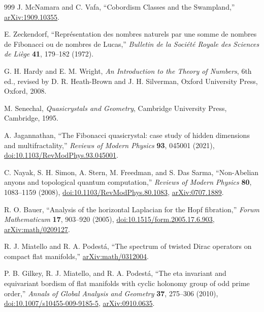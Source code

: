 \documentclass[aps,prd,reprint,nofootinbib,superscriptaddress,floatfix]{revtex4-2}
\numberwithin{equation}{section}
\theoremstyle{definition}
\theoremstyle{plain}
\begin{document}
\begin{thebibliography}{999}
J. McNamara and C. Vafa,
``Cobordism Classes and the Swampland,''
\href{https://arxiv.org/abs/1909.10355}{arXiv:1909.10355}.



E. Zeckendorf,
``Repr\'esentation des nombres naturels par une somme de nombres de Fibonacci ou de nombres de Lucas,''
\emph{Bulletin de la Soci\'et\'e Royale des Sciences de Li\`ege}
\textbf{41}, 179--182 (1972).

G. H. Hardy and E. M. Wright,
\emph{An Introduction to the Theory of Numbers},
6th ed., revised by D. R. Heath-Brown and J. H. Silverman,
Oxford University Press, Oxford, 2008.

M. Senechal,
\emph{Quasicrystals and Geometry},
Cambridge University Press, Cambridge, 1995.

A. Jagannathan,
``The Fibonacci quasicrystal: case study of hidden dimensions and multifractality,''
\emph{Reviews of Modern Physics} \textbf{93}, 045001 (2021),
\href{https://doi.org/10.1103/RevModPhys.93.045001}{doi:10.1103/RevModPhys.93.045001}.

C. Nayak, S. H. Simon, A. Stern, M. Freedman, and S. Das Sarma,
``Non-Abelian anyons and topological quantum computation,''
\emph{Reviews of Modern Physics} \textbf{80}, 1083--1159 (2008),
\href{https://doi.org/10.1103/RevModPhys.80.1083}{doi:10.1103/RevModPhys.80.1083},
\href{https://arxiv.org/abs/0707.1889}{arXiv:0707.1889}.





R. O. Bauer,
``Analysis of the horizontal Laplacian for the Hopf fibration,''
\emph{Forum Mathematicum} \textbf{17}, 903--920 (2005),
\href{https://doi.org/10.1515/form.2005.17.6.903}{doi:10.1515/form.2005.17.6.903},
\href{https://arxiv.org/abs/math/0209127}{arXiv:math/0209127}.

R. J. Miatello and R. A. Podest\'a,
``The spectrum of twisted Dirac operators on compact flat manifolds,''
\href{https://arxiv.org/abs/math/0312004}{arXiv:math/0312004}.

P. B. Gilkey, R. J. Miatello, and R. A. Podest\'a,
``The eta invariant and equivariant bordism of flat manifolds with cyclic
holonomy group of odd prime order,''
\emph{Annals of Global Analysis and Geometry} \textbf{37}, 275--306 (2010),
\href{https://doi.org/10.1007/s10455-009-9185-5}{doi:10.1007/s10455-009-9185-5},
\href{https://arxiv.org/abs/0910.0635}{arXiv:0910.0635}.


\end{thebibliography}
\end{document}
